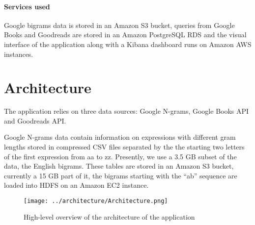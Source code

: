 \documentclass[12pt,letterpaper]{article}
\begin{document}
\paragraph{Services used} Google bigrams data is stored in an Amazon S3 bucket, queries from Google Books and Goodreads are stored in an Amazon PostgreSQL RDS and the visual interface of the application along with a Kibana 
dashboard runs on Amazon AWS instances.

\section{Architecture}

The application relies on three data sources: Google N-grams, Google Books API and Goodreads API. 

Google N-grams data contain information on expressions with different gram lengths stored in compressed CSV files
separated by the the starting two letters of the first expression from aa to zz. Presently, we use a 3.5 GB subset of the data, the English bigrams. These tables are stored in an Amazon S3 bucket, currently
a 15 GB part of it, the bigrams starting with the ``ab'' sequence are loaded into HDFS on an Amazon EC2 instance. 

\begin{figure}[b!]
\texttt{[image: ../architecture/Architecture.png]}
\caption{High-level overview of the architecture of the application}
\end{figure}
\end{document}

